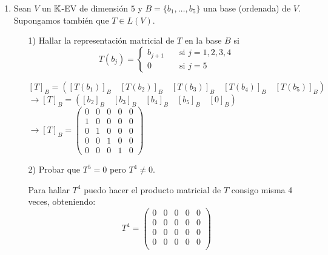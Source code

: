 \item \begin{enumerate}
        \item Sean $V$ un $\mathbb{K}$-EV de dimensión $5$ y $B=\{b_1,\dots,b_5\}$ una base (ordenada) de $V$. Supongamos también que $T\in L(V)$.
            \begin{enumerate}
                \item[1)] Hallar la representación matricial de $T$ en la base $B$ si\[T(b_j)=\begin{cases}
                        b_{j+1}\quad &\text{si } j=1,2,3,4\\
                        0&\text{si } j=5
                    \end{cases}\]
                    \begin{mdframed}[style=s]
                        \begin{center}
                            $[T]_B=\left([T(b_1)]_B\quad[T(b_2)]_B\quad[T(b_3)]_B\quad[T(b_4)]_B\quad[T(b_5)]_B\right)$\\
                            $\to [T]_B=\left([b_2]_B\quad[b_3]_B\quad[b_4]_B\quad[b_5]_B\quad[0]_B\right)$\\
                            $\to [T]_B=\begin{pmatrix}
                                0&0&0&0&0\\
                                1&0&0&0&0\\
                                0&1&0&0&0\\
                                0&0&1&0&0\\
                                0&0&0&1&0
                            \end{pmatrix}$
                        \end{center}
                    \end{mdframed}
                \item[2)] Probar que $T^5=0$ pero $T^4\neq 0$.\pagebreak
                    \begin{mdframed}[style=s]
                        Para hallar $T^4$ puedo hacer el producto matricial de $T$ consigo misma 4 veces, obteniendo:
                        \[T^4=\begin{pmatrix}
                            0&0&0&0&0\\
                            0&0&0&0&0\\
                            0&0&0&0&0\\
                            0&0&0&0&0\\

\end{pmatrix}\]
\end{mdframed}
\end{enumerate}
\end{enumerate}
